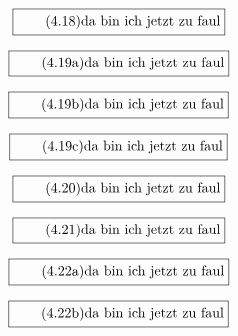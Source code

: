 \documentclass[11pt]{article}
\newcommand{\1}{ {\mathds{1}} }
\begin{document}
    \begin{equation}
      \boxed{
        \tag{4.18}
        \begin{split}
          \text{da bin ich jetzt zu faul}
        \end{split}
      }
    \end{equation}

    \begin{equation}
      \boxed{
        \tag{4.19a}
        \begin{split}
          \text{da bin ich jetzt zu faul}
        \end{split}
      }
    \end{equation}


    \begin{equation}
      \boxed{
        \tag{4.19b}
        \begin{split}
          \text{da bin ich jetzt zu faul}
        \end{split}
      }
    \end{equation}

    \begin{equation}
      \boxed{
        \tag{4.19c}
        \begin{split}
          \text{da bin ich jetzt zu faul}
        \end{split}
      }
    \end{equation}

    \begin{equation}
      \boxed{
        \tag{4.20}
        \begin{split}
          \text{da bin ich jetzt zu faul}
        \end{split}
      }
    \end{equation}

    \begin{equation}
      \boxed{
        \tag{4.21}
        \begin{split}
          \text{da bin ich jetzt zu faul}
        \end{split}
      }
    \end{equation}

    \begin{equation}
      \boxed{
        \tag{4.22a}
        \begin{split}
          \text{da bin ich jetzt zu faul}
        \end{split}
      }
    \end{equation}

    \begin{equation}
      \boxed{
        \tag{4.22b}
        \begin{split}
          \text{da bin ich jetzt zu faul}
        \end{split}
      }
    \end{equation}
    
\end{document}
